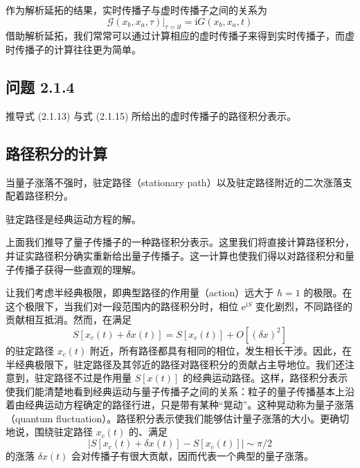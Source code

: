 作为解析延拓的结果，实时传播子与虚时传播子之间的关系为
\begin{equation*}
\boxed{\;\mathcal{G}(x_b,x_a,\tau)\big|_{\tau=\mathrm{i}t} = \mathrm{i}G(x_b,x_a,t)\;}
\end{equation*}
借助解析延拓，我们常常可以通过计算相应的虚时传播子来得到实时传播子，而虚时传播子的计算往往更为简单。

\subsection*{问题 2.1.4}

推导式 (2.1.13) 与式 (2.1.15) 所给出的虚时传播子的路径积分表示。

\subsection{路径积分的计算}

\begin{keypoints}
\item 当量子涨落不强时，驻定路径（stationary path）以及驻定路径附近的二次涨落支配着路径积分。
\item 驻定路径是经典运动方程的解。
\end{keypoints}

上面我们推导了量子传播子的一种路径积分表示。这里我们将直接计算路径积分，并证实路径积分确实重新给出量子传播子。这一计算也使我们得以对路径积分和量子传播子获得一些直观的理解。

让我们考虑半经典极限，即典型路径的作用量（action）远大于 $\hbar = 1$ 的极限。在这个极限下，当我们对一段范围内的路径积分时，相位 $\mathrm{e}^{\mathrm{i}S}$ 变化剧烈，不同路径的贡献相互抵消。然而，在满足
\begin{equation*}
S[x_c(t) + \delta x(t)] = S[x_c(t)] + O[(\delta x)^2] \tag{2.1.16}
\end{equation*}
的驻定路径 $x_c(t)$ 附近，所有路径都具有相同的相位，发生相长干涉。因此，在半经典极限下，驻定路径及其邻近的路径对路径积分的贡献占主导地位。我们还注意到，驻定路径不过是作用量 $S[x(t)]$ 的经典运动路径。这样，路径积分表示使我们能清楚地看到经典运动与量子传播子之间的关系：粒子的量子传播基本上沿着由经典运动方程确定的路径行进，只是带有某种“晃动”。这种晃动称为量子涨落（quantum fluctuation）。路径积分表示使我们能够估计量子涨落的大小。更确切地说，围绕驻定路径 $x_c(t)$ 的、满足
\begin{equation*}
\big|S[x_c(t)+\delta x(t)] - S[x_c(t)]\big| \sim \pi/2
\end{equation*}
的涨落 $\delta x(t)$ 会对传播子有很大贡献，因而代表一个典型的量子涨落。

